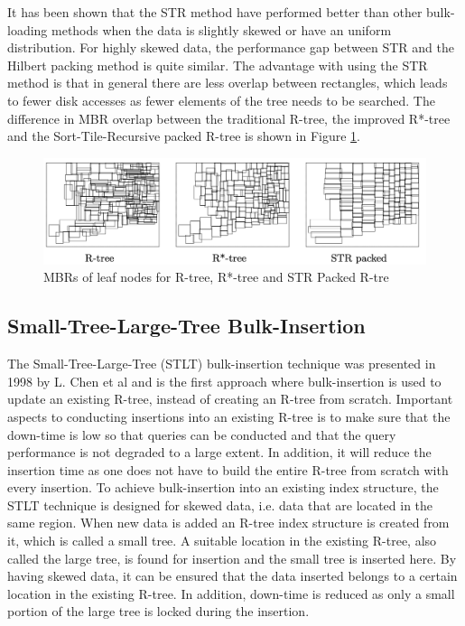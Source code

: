 \noindent
It has been shown that the STR method have performed better than other bulk-loading methods when the data is slightly skewed or have an uniform distribution. For highly skewed data, the performance gap between STR and the Hilbert packing method is quite similar\cite{STR}. The advantage with using the STR method is that in general there are less overlap between rectangles, which leads to fewer disk accesses as fewer elements of the tree needs to be searched. The difference in MBR overlap between the traditional R-tree, the improved R*-tree and the Sort-Tile-Recursive packed R-tree is shown in Figure \ref{fig:STRTree}.

\begin{figure}[ht]
    \centering
    \includegraphics[scale=0.7]{figures/STR.png}
    \caption{MBRs of leaf nodes for R-tree, R*-tree and STR Packed R-tre\cite{RTreesTheoryApplications}}
    \label{fig:STRTree}
\end{figure}

\subsection{Small-Tree-Large-Tree Bulk-Insertion}
The Small-Tree-Large-Tree (STLT) bulk-insertion technique was presented in 1998 by L. Chen et al\cite{STLT} and is the first approach where bulk-insertion is used to update an existing R-tree, instead of creating an R-tree from scratch. Important aspects to conducting insertions into an existing R-tree is to make sure that the down-time is low so that queries can be conducted and that the query performance is not degraded to a large extent. In addition, it will reduce the insertion time as one does not have to build the entire R-tree from scratch with every insertion. To achieve bulk-insertion into an existing index structure, the STLT technique is designed for skewed data, i.e. data that are located in the same region. When new data is added an R-tree index structure is created from it, which is called a small tree. A suitable location in the existing R-tree, also called the large tree, is found for insertion and the small tree is inserted here. By having skewed data, it can be ensured that the data inserted belongs to a certain location in the existing R-tree. In addition, down-time is reduced as only a small portion of the large tree is locked during the insertion.\newline

